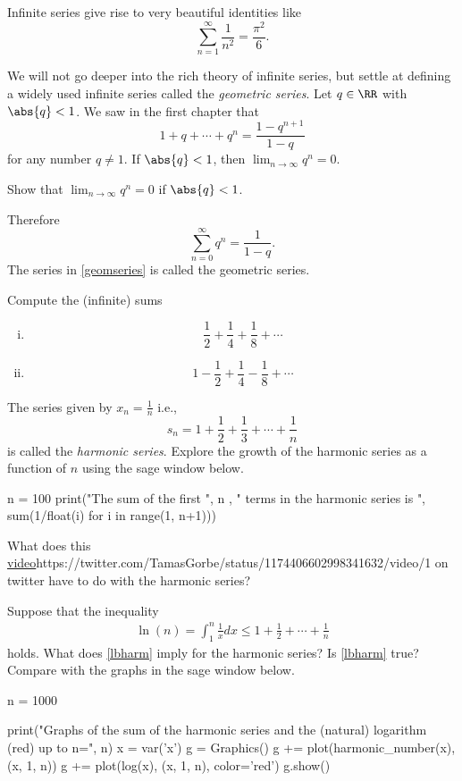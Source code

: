 \documentclass{article}
\begin{document}
Infinite series give rise to very beautiful identities like
$$
\sum_{n=1}^\infty \frac{1}{n^2} = \frac{\pi^2}{6}.
$$

We will not go deeper into the rich theory of infinite series, but
settle at defining a widely used infinite series called the
\emph{geometric series}.  Let $q\in \RR$ with $\abs{q} < 1$. We saw in
the first chapter that
$$
1 + q + \cdots + q^n = \frac{1 - q^{n+1}}{1-q}
$$
for any number $q\neq 1$. If $\abs{q} < 1$, then $\lim_{n\to\infty} q^n = 0$.

\beginshex
Show that $\lim_{n\to\infty} q^n = 0$ if $\abs{q} < 1$.
\endshex

Therefore
\begin{equation}\label{geomseries}
  \sum_{n=0}^\infty q^n = \frac{1}{1-q}.
\end{equation}
The series in \eqref{geomseries} is called the geometric series.

\beginshex
Compute the (infinite) sums
\begin{enumerate}[(i)]
\item
  $$
  \frac{1}{2} + \frac{1}{4} + \frac{1}{8} + \cdots
  $$
\item
  $$
  1 - \frac{1}{2} + \frac{1}{4} - \frac{1}{8} + \cdots
  $$
\end{enumerate}
\endshex

\beginshex
The series given by $x_n = \frac{1}{n}$ i.e.,
$$
s_n = 1 + \frac{1}{2} + \frac{1}{3} + \cdots + \frac{1}{n}
$$
is called the \emph{harmonic series}. Explore the growth of the harmonic series as a function of $n$
using the sage window below.

\begin{sage}
n = 100
print("The sum of the first ", n , " terms in the harmonic series is ", sum(1/float(i) for i in range(1, n+1)))
\end{sage}

What does this \url{video}{https://twitter.com/TamasGorbe/status/1174406602998341632/video/1}
on twitter have to do with the harmonic series?

Suppose that the inequality
\begin{align}\label{lbharm}
\ln(n) = \int_1^n \frac{1}{x} d x \leq 1 + \frac{1}{2} + \cdots + \frac{1}{n}
\end{align}
holds. What does \eqref{lbharm} imply for the harmonic series? Is \eqref{lbharm} true? Compare
with the graphs in the sage window below.

\begin{sage}
n = 1000
  
print("Graphs of the sum of the harmonic series and the (natural) logarithm (red) up to n=", n)
x = var('x')
g = Graphics()
g += plot(harmonic_number(x), (x, 1, n))
g += plot(log(x), (x, 1, n), color='red')
g.show()
\end{sage}
\end{document}
